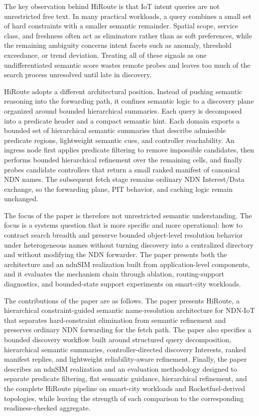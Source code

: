 \documentclass[journal]{IEEEtran}
\newcommand{\sysname}{HiRoute}
\begin{document}
The key observation behind \sysname{} is that IoT intent queries are not unrestricted free text. In many practical workloads, a query combines a small set of hard constraints with a smaller semantic remainder. Spatial scope, service class, and freshness often act as eliminators rather than as soft preferences, while the remaining ambiguity concerns intent facets such as anomaly, threshold exceedance, or trend deviation. Treating all of these signals as one undifferentiated semantic score wastes remote probes and leaves too much of the search process unresolved until late in discovery.

\sysname{} adopts a different architectural position. Instead of pushing semantic reasoning into the forwarding path, it confines semantic logic to a discovery plane organized around bounded hierarchical summaries. Each query is decomposed into a predicate header and a compact semantic hint. Each domain exports a bounded set of hierarchical semantic summaries that describe admissible predicate regions, lightweight semantic cues, and controller reachability. An ingress node first applies predicate filtering to remove impossible candidates, then performs bounded hierarchical refinement over the remaining cells, and finally probes candidate controllers that return a small ranked manifest of canonical NDN names. The subsequent fetch stage remains ordinary NDN Interest/Data exchange, so the forwarding plane, PIT behavior, and caching logic remain unchanged.

The focus of the paper is therefore not unrestricted semantic understanding. The focus is a systems question that is more specific and more operational: how to contract search breadth and preserve bounded object-level resolution behavior under heterogeneous names without turning discovery into a centralized directory and without modifying the NDN forwarder. The paper presents both the architecture and an ndnSIM realization built from application-level components, and it evaluates the mechanism chain through ablation, routing-support diagnostics, and bounded-state support experiments on smart-city workloads.

The contributions of the paper are as follows. The paper presents \sysname{}, a hierarchical constraint-guided semantic name-resolution architecture for NDN-IoT that separates hard-constraint elimination from semantic refinement and preserves ordinary NDN forwarding for the fetch path. The paper also specifies a bounded discovery workflow built around structured query decomposition, hierarchical semantic summaries, controller-directed discovery Interests, ranked manifest replies, and lightweight reliability-aware refinement. Finally, the paper describes an ndnSIM realization and an evaluation methodology designed to separate predicate filtering, flat semantic guidance, hierarchical refinement, and the complete \sysname{} pipeline on smart-city workloads and Rocketfuel-derived topologies, while leaving the strength of each comparison to the corresponding readiness-checked aggregate.
\end{document}
